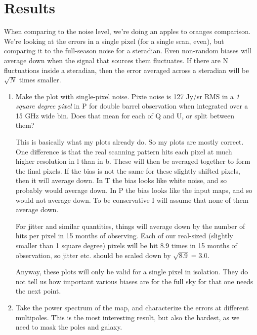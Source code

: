 \documentclass{article}
\begin{document}
\section{Results}
{\color{red}When comparing to the noise level, we're doing an apples
to oranges comparison. We're looking at the errors in a single pixel
(for a single scan, even), but comparing it to the full-season noise
for a steradian. Even non-random biases will average down when the signal
that sources them fluctuates. If there are N fluctuations inside a steradian,
then the error averaged across a steradian will be $\sqrt{N}$ times smaller.

\begin{enumerate}
	\item Make the plot with single-pixel noise. Pixie noise is 127 Jy/sr RMS in a \emph{1
		square degree pixel} in P for double barrel observation when
		integrated over a 15 GHz wide bin. Does that mean for each of Q and U,
		or split between them?

		This is basically what my plots already do. So my plots are mostly
		correct. One difference is that the real scanning pattern hits
		each pixel at much higher resolution in l than in b. These will
		then be averaged together to form the final pixels. If the bias
		is not the same for these slightly shifted pixels, then it will
		average down. In T the bias looks like white noise, and so probably
		would average down. In P the bias looks like the input maps, and
		so would not average down. To be conservative I will assume that
		none of them average down.

		For jitter and similar quantities, things will average down by
		the number of hits per pixel in 15 months of observing. Each
		of our real-sized (slightly smaller than 1 square degree) pixels
		will be hit 8.9 times in 15 months of observation, so jitter etc.
		should be scaled down by $\sqrt{8.9} = 3.0$.

		Anyway, these plots will only be valid for a single pixel in isolation.
		They do not tell us how important various biases are for the full sky
		for that one needs the next point.

	\item Take the power spectrum of the map, and characterize the errors
		at different multipoles. This is the most interesting result, but
		also the hardest, as we need to mask the poles and galaxy.
\end{enumerate}

}
\end{document}
